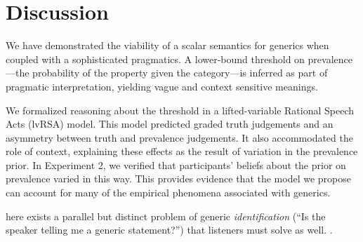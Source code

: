 \documentclass[10pt,letterpaper]{article}
\begin{document}
\section{Discussion}



We have demonstrated the viability of a scalar semantics for generics when coupled with a sophisticated pragmatics. 
A lower-bound threshold on prevalence---the probability of the property given the category---is inferred as part of pragmatic interpretation, yielding vague and context sensitive meanings. 
%

%
We formalized reasoning about the threshold in a lifted-variable Rational Speech Acts (lvRSA) model. This model predicted graded truth judgements and an asymmetry between truth and prevalence judgements. It also accommodated the role of context, explaining these effects as the result of variation in the prevalence prior. 
In Experiment 2, we verified that participants' beliefs about the prior on prevalence varied in this way. 
This provides evidence that the model we propose can account for many of the empirical phenomena associated with generics.


here exists a parallel but distinct problem of generic \emph{identification} (``Is the speaker telling me a generic statement?'') \cite{Cimpian2008} that listeners must solve as well. . 

%
\end{document}
